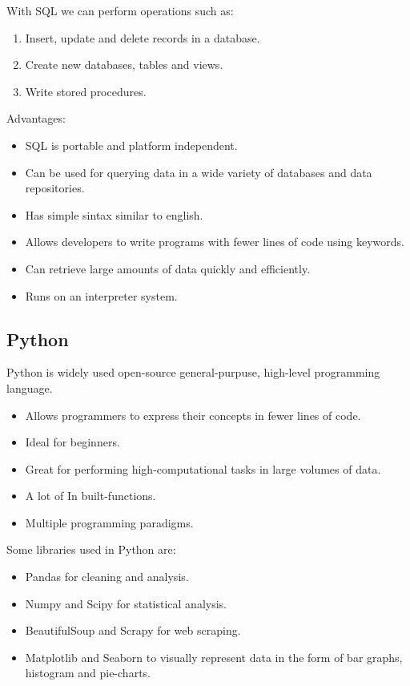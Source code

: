 \documentclass[../../ibm_data_analysis.tex]{subfiles}
\begin{document}
    With SQL we can perform operations such as:
    \begin{enumerate}
        \item Insert, update and delete records in a database.
        \item Create new databases, tables and views.
        \item Write stored procedures.
    \end{enumerate}

    \begin{obs}
        Advantages:
        \begin{itemize}
            \item SQL is portable and platform independent.
            \item Can be used for querying data in a wide variety of databases and data repositories.
            \item Has simple sintax similar to english.
            \item Allows developers to write programs with fewer lines of code using keywords.
            \item Can retrieve large amounts of data quickly and efficiently.
            \item Runs on an interpreter system.
        \end{itemize}
    \end{obs}

    \subsection{Python}

    Python is widely used open-source general-purpuse, high-level programming language.

    \begin{itemize}
        \item Allows programmers to express their concepts in fewer lines of code.
        \item Ideal for beginners.
        \item Great for performing high-computational tasks in large volumes of data.
        \item A lot of In built-functions.
        \item Multiple programming paradigms.
    \end{itemize}

    \begin{idea}
        Some libraries used in Python are:
        \begin{itemize}
            \item Pandas for cleaning and analysis.
            \item Numpy and Scipy for statistical analysis.
            \item BeautifulSoup and Scrapy for web scraping.
            \item Matplotlib and Seaborn to visually represent data in the form of bar graphs, histogram and pie-charts.
        \end{itemize}
    \end{idea}
\end{document}
